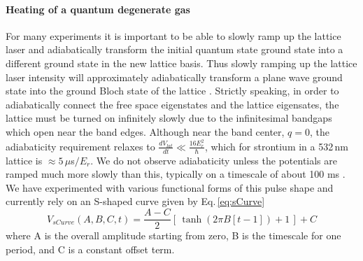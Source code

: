\paragraph{Heating of a quantum degenerate gas}
For many experiments it is important to be able to slowly ramp up the lattice laser and adiabatically transform the initial quantum state ground state into a different ground state in the new lattice basis.
Thus slowly ramping up the lattice laser intensity will approximately adiabatically transform a plane wave ground state into the ground Bloch state of the lattice \cite{Sakurai2010}. 
Strictly speaking, in order to adiabatically connect the free space eigenstates and the lattice eigensates, the lattice must be turned on infinitely slowly due to the infinitesimal bandgaps which open near the band edges. 
Although near the band center, $q=0$, the adiabaticity requirement relaxes to $\displaystyle \frac{dV_{lat}}{dt} \ll \frac{16E_r^2}{\hbar}$, \cite{Denschlag2002} which for strontium in a 532\,nm lattice is $\approx\!5\,\mu$s$/E_r$. 
We do not observe adiabaticity unless the potentials are ramped much more slowly than this, typically on a timescale of about 100 ms \cite{Blakie2004}.
We have experimented with various functional forms of this pulse shape and currently rely on an S-shaped curve given by Eq.\,\ref{eq:sCurve}
\begin{equation} \label{eq:sCurve}
	V_{sCurve}(A,B,C,t) = \frac{A-C}{2} \left[ \, \tanh \left( 2 \pi B[t-1] \right) +1 \, \right] + C
\end{equation}
where A is the overall amplitude starting from zero, B is the timescale for one period, and C is a constant offset term.

